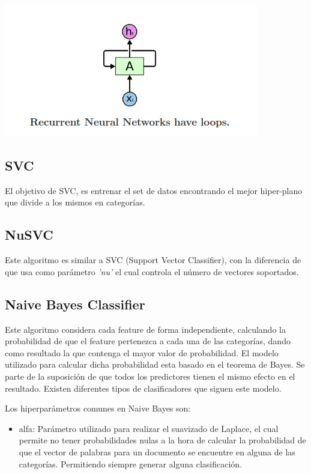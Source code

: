 \documentclass[12pt,a4paper]{article}
\begin{document}
\begin{center}
    \includegraphics[scale=0.5]{imgs/red neuronal recurrente.png}
\end{center}



\subsection{SVC}
El objetivo de SVC, es entrenar el set de datos encontrando el mejor hiper-plano que divide a los mismos en categorías.

\subsection{NuSVC}
Este algoritmo es similar a SVC (Support Vector Classifier), con la diferencia de que usa como parámetro \textit{'nu'} el cual controla el número de vectores soportados.

\subsection{Naive Bayes Classifier}
Este algoritmo considera cada feature de forma independiente, calculando la probabilidad de que el feature pertenezca a cada una de las categorías, dando como resultado la que contenga el mayor valor de probabilidad. El modelo utilizado para calcular dicha probabilidad esta basado en el teorema de Bayes. Se parte de la suposición de que todos los predictores tienen el mismo efecto en el resultado. Existen diferentes tipos de clasificadores que siguen este modelo.

Los hiperparámetros comunes en Naive Bayes son:
\begin{itemize}
    \item alfa: Parámetro utilizado para realizar el suavizado de Laplace, el cual permite no tener probabilidades nulas a la hora de calcular la probabilidad de que el vector de palabras para un documento se encuentre en alguna de las categorías. Permitiendo siempre generar alguna clasificación. 
\end{itemize}
\end{document}
